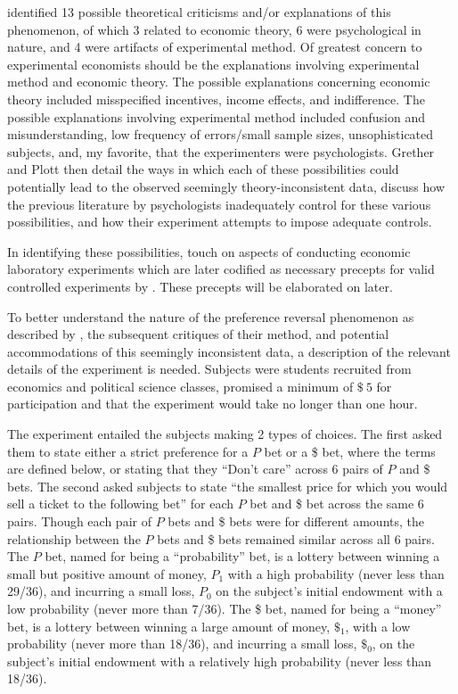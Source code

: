 \documentclass[11pt,a4paper]{report}
\newcommand{\money}[1]{$\$\!\:#1$}          %
\begin{document}
\textcite{Grether1979} identified 13 possible theoretical criticisms and/or explanations of this phenomenon, of which 3 related to economic theory, 6 were psychological in nature, and 4 were artifacts of experimental method.
Of greatest concern to experimental economists should be the explanations involving experimental method and economic theory.
The possible explanations concerning economic theory included misspecified incentives, income effects, and indifference.
The possible explanations involving experimental method included confusion and misunderstanding, low frequency of errors/small sample sizes, unsophisticated subjects, and, my favorite, that the experimenters were psychologists.
Grether and Plott then detail the ways in which each of these possibilities could potentially lead to the observed seemingly theory-inconsistent data, discuss how the previous literature by psychologists inadequately control for these various possibilities, and how their experiment attempts to impose adequate controls.

In identifying these possibilities, \textcite{Grether1979} touch on aspects of conducting economic laboratory experiments which are later codified as necessary precepts for valid controlled experiments by \textcite{Smith1982}.{\footnotemark} 
These precepts will be elaborated on later.

\addtocounter{footnote}{-1}

To better understand the nature of the preference reversal phenomenon as described by \textcite{Grether1979}, the subsequent critiques of their method, and potential accommodations of this seemingly inconsistent data, a description of the relevant details of the experiment is needed.
Subjects were students recruited from economics and political science classes, promised a minimum of \money{5} for participation and that the experiment would take no longer than one hour.

The experiment entailed the subjects making 2 types of choices.
The first asked them to state either a strict preference for a $P$ bet or a \$ bet, where the terms are defined below, or stating that they \enquote{Don't care} across 6 pairs of $P$ and \$ bets.
The second asked subjects to state \enquote{the smallest price for which you would sell a ticket to the following bet} \parencite*[630]{Grether1979} for each $P$ bet and \$ bet across the same 6 pairs.
Though each pair of $P$ bets and \$ bets were for different amounts, the relationship between the $P$ bets and \$ bets remained similar across all 6 pairs.
The $P$ bet, named for being a \enquote{probability} bet, is a lottery between winning a small but positive amount of money, $P_1$ with a high probability (never less than 29/36), and incurring a small loss, $P_0$ on the subject's initial endowment with a low probability (never more than 7/36).
The \$ bet, named for being a \enquote{money} bet, is a lottery between winning a large amount of money, $\$_1$, with a low probability (never more than 18/36), and incurring a small loss, $\$_0$, on the subject's initial endowment with a relatively high probability (never less than 18/36).
\end{document}
